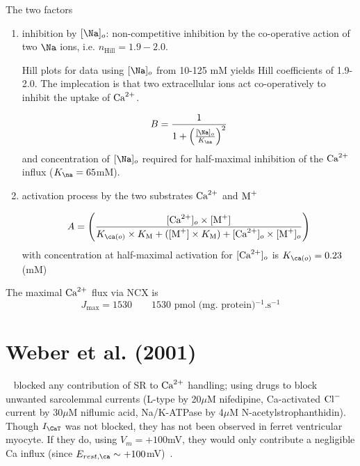 The two factors
\begin{enumerate}
  \item inhibition by $[\Na]_o$: non-competitive inhibition by the co-operative
  action of two $\Na$ ions, i.e. $n_\text{Hill}=1.9-2.0$.
  
  Hill plots for data using $[\Na]_o$ from 10-125 mM yields Hill coefficients of
  1.9-2.0. The implecation is that two extracellular ions act co-operatively to
  inhibit the uptake of ${\text{Ca}^{2+}}$.

  
\begin{equation}
B = \frac{1}{1 + \left( \frac{[\Na]_o}{K_{\na}} \right)^2}
\end{equation}
and concentration of $[\Na]_o$ required for half-maximal inhibition of the ${\text{Ca}^{2+}}$
influx ($K_{\na}=65$mM).



  \item activation process by the two substrates ${\text{Ca}^{2+}}$ and $\ce{M^+}$
  
\begin{equation}
A = \left( \frac{[\Ca]_o \times [\ce{M^+}]}{ K_{\ca(o)} \times K_{\ce{M}} +
     ([\ce{M^+}] \times K_{\ce{M}}) + [\Ca]_o \times [\ce{M^+}]_o }
\right)
\end{equation}
with concentration at half-maximal activation for $[{\text{Ca}^{2+}}]_o$ is $K_{\ca(o)}=0.23$
(mM)

\end{enumerate}

The maximal ${\text{Ca}^{2+}}$ flux via NCX is 
\begin{equation}
J_\max = 1530 \qquad \text {1530 pmol (mg. protein)$^{-1}$.s$^{-1}$}
\end{equation}




\section{Weber et al. (2001)}
\label{sec:weber-et-al}

~\citep{weber2001} blocked any contribution of SR to ${\text{Ca}^{2+}}$ handling;
using drugs to block unwanted sarcolemmal currents (L-type by 20$\mu$M
nifedipine, Ca-activated ${\text{Cl}^{-}}$ current by 30$\mu$M niflumic acid,
Na/K-ATPase by 4$\mu$M N-acetylstrophanthidin). Though $I_\CaT$ was
not blocked, they has not been observed in ferret ventricular
myocyte. If they do, using $V_m=+100$mV, they would only contribute a
negligible Ca influx (since $E_{rest,\ca}\sim
+100$mV)~\citep{satin2000}.

